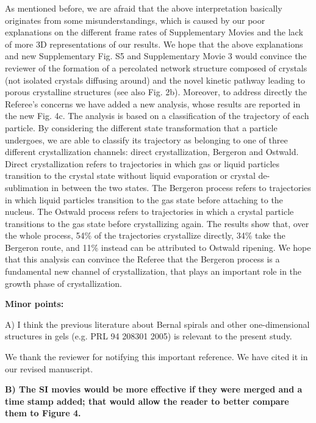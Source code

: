 \documentclass[11pt,a4paper]{article}
\newenvironment{referee}%
{\bigskip\singlespacing\bf}%
{\par\bigskip}
\begin{document}
As mentioned before, we are afraid that the above interpretation basically originates from some misunderstandings, which is caused by our poor explanations on the different frame rates of Supplementary Movies and the lack of more 3D representations of our results. We hope that the above explanations and new Supplementary Fig. S5 and Supplementary Movie 3 would convince the reviewer of the formation of a percolated network structure composed of crystals (not isolated crystals diffusing around) and the novel kinetic pathway leading to porous crystalline structures (see also Fig. 2b).
Moreover, to address directly the Referee's concerns we have added a new analysis, whose results are reported in the new Fig. 4c.
The analysis is based on a classification of the trajectory of 
each particle. By considering the different state transformation that a particle undergoes, we are able to classify its trajectory as belonging to one of three different crystallization channels: direct crystallization, Bergeron and Ostwald. Direct crystallization refers to trajectories in
which gas or liquid particles transition to the crystal state without liquid evaporation or crystal de-sublimation in between the two states.
The Bergeron process refers to trajectories in which liquid particles transition to the gas state before attaching to the nucleus. The Ostwald
process refers to trajectories in which a crystal particle transitions to the gas state before crystallizing again.
The results show that, over the whole process, 54\% of the trajectories crystallize directly, 34\% take the Bergeron route, and
11\% instead can be attributed to Ostwald ripening. We hope that this analysis can convince the Referee that the Bergeron process is a
fundamental new channel of crystallization, that plays an important role in the growth phase of crystallization.


\begin{referee}
Minor points:

A) I think the previous literature about Bernal spirals and other one-dimensional structures in gels (e.g. PRL 94 208301 2005) is relevant to the present study.
\end{referee}

We thank the reviewer for notifying this important reference. We have cited it in our revised manuscript. 


\begin{referee}
B) The SI movies would be more effective if they were merged and a time stamp added; that would allow the reader to better compare them to Figure 4.
\end{referee}
\end{document}
